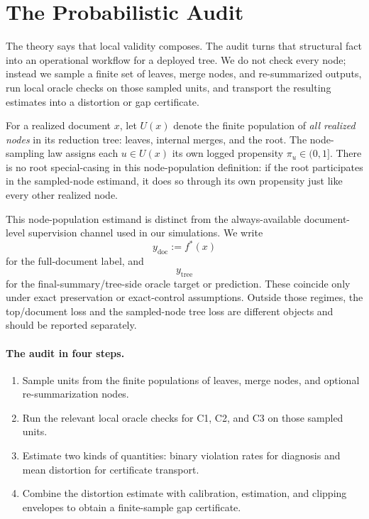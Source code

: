 \section{The Probabilistic Audit}\label{sec:estimation}

The theory says that local validity composes. The audit turns that structural fact into an operational workflow for a deployed tree. We do not check every node; instead we sample a finite set of leaves, merge nodes, and re-summarized outputs, run local oracle checks on those sampled units, and transport the resulting estimates into a distortion or gap certificate.

For a realized document $x$, let $U(x)$ denote the finite population of \emph{all realized nodes} in its reduction tree: leaves, internal merges, and the root. The node-sampling law assigns each $u \in U(x)$ its own logged propensity $\pi_u \in (0,1]$. There is no root special-casing in this node-population definition: if the root participates in the sampled-node estimand, it does so through its own propensity just like every other realized node.

This node-population estimand is distinct from the always-available document-level supervision channel used in our simulations. We write
\[
y_{\mathrm{doc}} := f^\ast(x)
\]
for the full-document label, and
\[
y_{\mathrm{tree}}
\]
for the final-summary/tree-side oracle target or prediction. These coincide only under exact preservation or exact-control assumptions. Outside those regimes, the top/document loss and the sampled-node tree loss are different objects and should be reported separately.

\paragraph{The audit in four steps.}
\begin{enumerate}[leftmargin=1.5em]
    \item Sample units from the finite populations of leaves, merge nodes, and optional re-summarization nodes.
    \item Run the relevant local oracle checks for C1, C2, and C3 on those sampled units.
    \item Estimate two kinds of quantities: binary violation rates for diagnosis and mean distortion for certificate transport.
    \item Combine the distortion estimate with calibration, estimation, and clipping envelopes to obtain a finite-sample gap certificate.
\end{enumerate}

